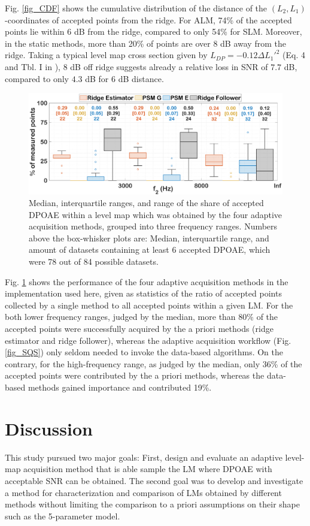 \documentclass[journal,twoside,web]{ieeecolor2}
\begin{document}
Fig. \ref{fig_CDF} shows the cumulative distribution of the distance of the $(L_2, L_1)$-coordinates of accepted points from the ridge.
For ALM, 74\% of the accepted points lie within $6$ dB from the ridge, compared to only 54\% for SLM.
Moreover, in the static methods, more than 20\% of points are over $8$ dB away from the ridge.
Taking a typical level map cross section given by $L_{DP} =-0.12 \Delta L_1'^2$ (Eq. 4 and Tbl. I in \cite{ZD2020}), $8$ dB off ridge suggests already a relative loss in SNR of $7.7$ dB, compared to only $4.3$ dB for $6$ dB distance.

\begin{figure}[ht]
\centerline{\includegraphics[width=\columnwidth]{Fig_10_Boxplots.eps}}
\caption{Median, interquartile ranges, and range of the share of accepted DPOAE within a level map which was obtained by the four adaptive acquisition methods, grouped into three frequency ranges.
Numbers above the box-whisker plots are: Median, interquartile range, and amount of datasets containing at least 6 accepted DPOAE, which were 78 out of 84 possible datasets.}
\label{fig_BXP}
\end{figure}

Fig. \ref{fig_BXP} shows the performance of the four adaptive acquisition methods in the implementation used here, given as statistics of the ratio of accepted points collected by a single method to all accepted points within a given LM.
For the both lower frequency ranges, judged by the median, more than 80\% of the accepted points were successfully acquired by the a priori methods (ridge estimator and ridge follower), whereas the adaptive acquisition workflow (Fig. \ref{fig_SQS}) only seldom needed to invoke the data-based algorithms.
On the contrary, for the high-frequency range, as judged by the median, only 36\% of the accepted points were contributed by the a priori methods, whereas the data-based methods gained importance and contributed 19\%.

\section{Discussion}
This study pursued two major goals: First, design and evaluate an adaptive level-map acquisition method that is able sample the LM where DPOAE with acceptable SNR can be obtained.
The second goal was to develop and investigate a method for characterization and comparison of LMs obtained by different methods without limiting the comparison to a priori assumptions on their shape such as the 5-parameter model.
\end{document}
